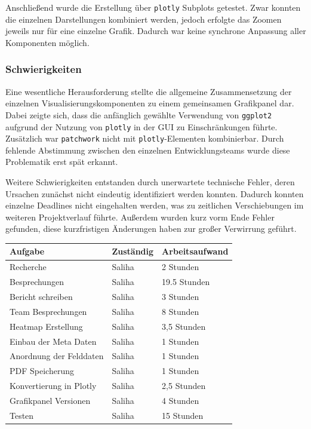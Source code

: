 \documentclass[12pt]{article}
\begin{document}
Anschließend wurde die Erstellung über \texttt{plotly} Subplots getestet. Zwar konnten die einzelnen Darstellungen kombiniert werden, jedoch erfolgte das Zoomen jeweils nur für eine einzelne Grafik. Dadurch war keine synchrone Anpassung aller Komponenten möglich.


\subsubsection{Schwierigkeiten}
Eine wesentliche Herausforderung stellte die allgemeine Zusammensetzung der einzelnen Visualisierungskomponenten zu einem gemeinsamen Grafikpanel dar. Dabei zeigte sich, dass die anfänglich gewählte Verwendung von \texttt{ggplot2} aufgrund der Nutzung von \texttt{plotly} in der GUI zu Einschränkungen führte. Zusätzlich war \texttt{patchwork} nicht mit \texttt{plotly}-Elementen kombinierbar. Durch fehlende Abstimmung zwischen den einzelnen Entwicklungsteams wurde diese Problematik erst spät erkannt.

Weitere Schwierigkeiten entstanden durch unerwartete technische Fehler, deren Ursachen zunächst nicht eindeutig identifiziert werden konnten. Dadurch konnten einzelne Deadlines nicht eingehalten werden, was zu zeitlichen Verschiebungen im weiteren Projektverlauf führte. Außerdem wurden kurz vorm Ende Fehler gefunden, diese kurzfristigen Änderungen haben zur großer Verwirrung geführt. 


\begin{table}[h]
	\begin{tabular}{l|l|l}
		Aufgabe                       & Zuständig & Arbeitsaufwand \\ 
		\hline
		Recherche                     & Saliha    & 2 Stunden       \\
		Besprechungen                 & Saliha    & 19.5 Stunden    \\
		Bericht schreiben             & Saliha    & 3 Stunden  		\\
		Team Besprechungen            & Saliha    & 8 Stunden 		\\
		Heatmap Erstellung            & Saliha    & 3,5 Stunden       \\
		Einbau der Meta Daten     	  & Saliha    & 1 Stunden       \\ 
        Anordnung der Felddaten       & Saliha    & 1 Stunden       \\
        PDF Speicherung               & Saliha    & 1 Stunden       \\
        Konvertierung in Plotly       & Saliha    & 2,5 Stunden       \\
		Grafikpanel Versionen         & Saliha    & 4 Stunden       \\ 
		Testen                        & Saliha    & 15 Stunden      \\ 

	\end{tabular}
\end{table}
\end{document}
